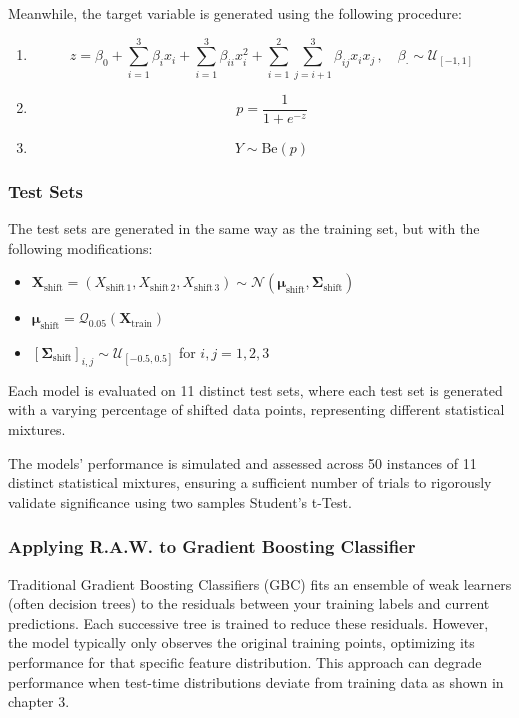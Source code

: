 Meanwhile, the target variable is generated using the following procedure:

\begin{enumerate}
    \item $$ 
    z = \beta_0 + \sum_{i=1}^3 \beta_i x_i + \sum_{i=1}^3 \beta_{ii} x_i^2 + \sum_{i=1}^{2} \sum_{j=i+1}^3 \beta_{ij} x_i x_j\,,   \quad \beta_{\cdot} \sim \mathcal{U}_{[-1,1]}
    $$
    \item $$ p = \frac{1}{1 + e^{-z}}$$
    \item $$ Y \sim \text{Be}(p)$$
\end{enumerate}

\subsubsection{Test Sets}
The test sets are generated in the same way as the training set, but with the following modifications:

\begin{itemize}
    \item $ \boldsymbol{X}_{\text{shift}} = (X_{\text{shift}\,1}, X_{\text{shift}\,2}, X_{\text{shift}\,3}) \sim \mathcal{N}(\boldsymbol{\mu}_{\text{shift}}, \boldsymbol{\Sigma}_{\text{shift}}) $
    \item $ \boldsymbol{\mu}_{\text{shift}} = \mathcal{Q}_{0.05}(\boldsymbol{X}_{\text{train}})$
    \item $ [\boldsymbol{\Sigma}_{\text{shift}}]_{i,j} \sim \mathcal{U}_{[-0.5,0.5]} $ for $ i, j = 1, 2, 3 $
\end{itemize}
Each model is evaluated on 11 distinct test sets, where each test set is generated with a varying percentage of shifted data points, representing different statistical mixtures.

The models' performance is simulated and assessed across 50 instances of 11 distinct statistical mixtures, ensuring a sufficient number of trials to rigorously validate significance using two samples Student's t-Test.

\subsubsection{Applying R.A.W. to Gradient Boosting Classifier}

Traditional Gradient Boosting Classifiers (GBC) fits an ensemble of weak learners (often decision trees) to the residuals between your training labels and current predictions. Each successive tree is trained to reduce these residuals. However, the model typically only observes the original training points, optimizing its performance for that specific feature distribution. This approach can degrade performance when test-time distributions deviate from training data as shown in chapter 3. 

